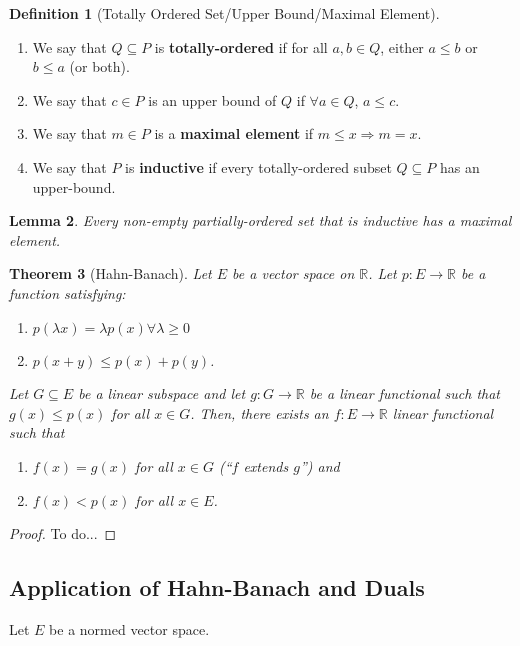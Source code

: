 \documentclass[psamsfonts]{amsart}
\newtheorem{thm}{Theorem}[section]
\newtheorem{lem}[thm]{Lemma}
\theoremstyle{definition}
\newtheorem{defn}[thm]{Definition}
\theoremstyle{remark}
\newcommand{\R}[0]{\mathbb{R}}
\numberwithin{equation}{section}
\begin{document}
\begin{defn}[Totally Ordered Set/Upper Bound/Maximal Element]
	\begin{enumerate}
		\item We say that \( Q \subseteq P \) is \textbf{totally-ordered} if for all \( a, b \in Q \), either \( a \leq b \) or \( b \leq a \) (or both).
		\item We say that \( c \in P \) is an upper bound of \( Q \) if \( \forall a \in Q \), \( a \leq c \). 
		\item We say that \( m \in P \) is a \textbf{maximal element} if \( m \leq x \Rightarrow m=x \).
		\item We say that \( P \) is \textbf{inductive} if every totally-ordered subset \( Q \subseteq P \) has an upper-bound.
	\end{enumerate}
\end{defn}

\begin{lem}
	Every non-empty partially-ordered set that is inductive has a maximal element.
\end{lem}

\begin{thm}[Hahn-Banach]
	Let \( E \) be a vector space on \( \R \). Let \( p: E \rightarrow \R \) be a function satisfying:
	\begin{enumerate}
		\item \( p(\lambda x) = \lambda p(x) \forall \lambda \geq 0 \) 
		\item \( p(x+y) \leq p(x) + p(y) \). 
	\end{enumerate}
	Let \( G \subseteq E \) be a linear subspace and let \( g: G \rightarrow \R \) be a linear functional such that \(g(x) \leq p(x) \) for all \( x \in G \). Then,  there exists an \( f: E \rightarrow \R \) linear functional such that
	\begin{enumerate}
		\item \(f(x) = g(x) \) for all \( x \in G \) (``\(f\) extends \( g\)'') and 
		\item \( f(x) < p(x) \) for all \( x \in E \).
	\end{enumerate}
\end{thm}

\begin{proof}
	To do...
\end{proof}

\subsection{Application of Hahn-Banach and Duals}
Let \( E \) be a normed vector space. 
\end{document}
